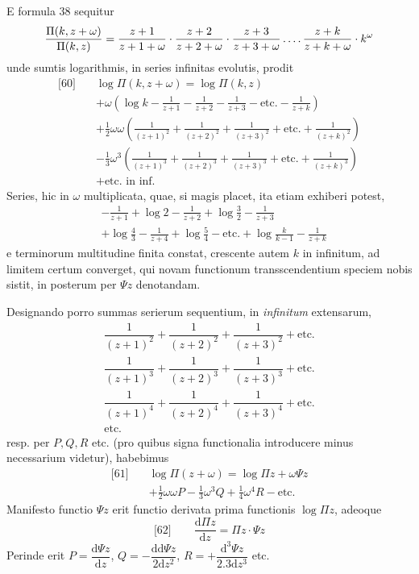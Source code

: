 E formula 38 sequitur
\[
\frac{\Pi(k,z+\omega)}{\Pi(k,z)}
=\frac{z+1}{z+1+\omega}\cdot\frac{z+2}{z+2+\omega}\cdot\frac{z+3}{z+3+\omega}
\mathinner{.\,.\,.\,.}\frac{z+k}{z+k+\omega}\cdot k^{\omega}
\]
unde sumtis logarithmis, in series infinitas evolutis, prodit
\[
\begin{aligned}
{}\text{[60]}\quad&\log\Pi(k,z+\omega)=\log\Pi(k,z)\\
&+\omega\left(\log k-\frac{1}{z+1}-\frac{1}{z+2}-\frac{1}{z+3}-\text{etc.}-\frac{1}{z+k}\right)\\
&+\tfrac12\omega\omega\left(\frac{1}{(z+1)^2}+\frac{1}{(z+2)^2}+\frac{1}{(z+3)^2}+\text{etc.}+\frac{1}{(z+k)^2}\right)\\
&-\tfrac13\omega^3\left(\frac{1}{(z+1)^3}+\frac{1}{(z+2)^3}+\frac{1}{(z+3)^3}+\text{etc.}+\frac{1}{(z+k)^3}\right)\\
&+\text{etc. in inf.}
\end{aligned}
\]
Series, hic in $\omega$ multiplicata, quae, si magis placet, ita etiam exhiberi potest,
\[
\begin{aligned}
&-\frac{1}{z+1}+\log 2-\frac{1}{z+2}+\log\tfrac32-\frac{1}{z+3}\\[4pt]
&+\log\tfrac43-\frac{1}{z+4}+\log\tfrac54-\text{etc.}
+\log\frac{k}{k-1}-\frac{1}{z+k}
\end{aligned}
\]
e terminorum multitudine finita constat, crescente autem $k$ in infinitum, ad limitem certum converget, qui novam functionum transscendentium speciem nobis sistit, in posterum per $\Psi z$ denotandam.

Designando porro summas serierum sequentium, in \textit{infinitum} extensarum,
\[
\begin{array}{l}
\dfrac{1}{(z+1)^2}+\dfrac{1}{(z+2)^2}+\dfrac{1}{(z+3)^2}+\text{etc.}\\[10pt]
\dfrac{1}{(z+1)^3}+\dfrac{1}{(z+2)^3}+\dfrac{1}{(z+3)^3}+\text{etc.}\\[10pt]
\dfrac{1}{(z+1)^4}+\dfrac{1}{(z+2)^4}+\dfrac{1}{(z+3)^4}+\text{etc.}\\[10pt]
\text{etc.}
\end{array}
\]
resp. per $P,Q,R$ etc. (pro quibus signa functionalia introducere minus necessarium videtur), habebimus
\[
\begin{aligned}
{}\text{[61]}\quad&\log\Pi(z+\omega)=\log\Pi z+\omega\Psi z\\[4pt]
&+\tfrac12\omega\omega P-\tfrac13\omega^3Q+\tfrac14\omega^4R-\text{etc.}
\end{aligned}
\]
Manifesto functio $\Psi z$ erit functio derivata prima functionis $\log\Pi z$, adeoque
\[
{}\text{[62]}\qquad \frac{\mathrm{d}\Pi z}{\mathrm{d}z}=\Pi z\cdot\Psi z
\]
Perinde erit $P=\dfrac{\mathrm{d}\Psi z}{\mathrm{d}z}$, $Q=-\dfrac{\mathrm{dd}\Psi z}{2\mathrm{d}z^2}$, $R=+\dfrac{\mathrm{d}^3\Psi z}{2.3\mathrm{d}z^3}$ etc.
